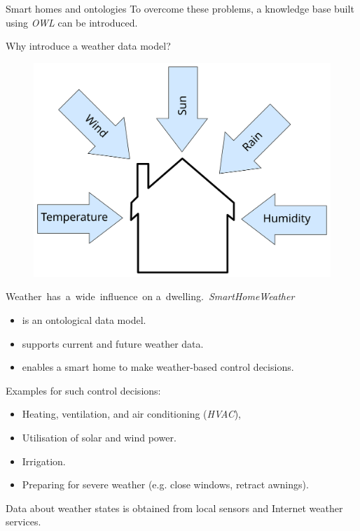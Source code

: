 \documentclass[final,hyperref={pdfpagelabels=true}]{beamer}
\begin{document}
\begin{frame}[fragile]
\begin{columns}[t]
\begin{column}{.45\textwidth}
\begin{block}{Smart homes and ontologies}
	\vspace{.5em}
	To overcome these problems, a knowledge
	base built using \emph{OWL} can be introduced.
      \end{block}

      \begin{block}{Why introduce a weather data model?}
        \begin{figure}
	  \centering
	  \includegraphics[width=.45\textwidth]{figures/inkscape/house}
	\end{figure}

	\vspace{-1.5em}
	
	\mbox{Weather has a wide influence on}
	\mbox{a dwelling. \emph{SmartHomeWeather}}
	
	\begin{itemize}
	  \item is an ontological data model.
	  \item supports current and future weather data.
	  \item enables a smart home to make weather-based control decisions.
	\end{itemize}

	\vspace{.5em}
	Examples for such control decisions:
	
	\begin{itemize}
  	  \item Heating, ventilation, and air conditioning (\emph{HVAC}),
	  \item Utilisation of solar and wind power.
	  \item Irrigation.
	  \item Preparing for severe weather (e.g. close windows, retract awnings).
	\end{itemize}

	\vspace{.5em}
	Data about weather states is obtained from local sensors and Internet weather services.
      \end{block}


\end{column}
\end{columns}
\end{frame}
\end{document}
